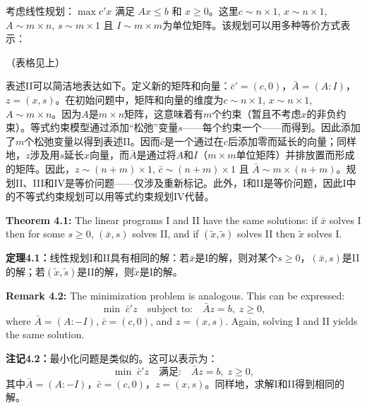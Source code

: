 \begin{translation}
考虑线性规划：$\max c' x$ 满足 $Ax \le b$ 和 $x \ge 0$。这里$c \sim n \times 1$, $x \sim n \times 1$, $A \sim m \times n$, $s \sim m \times 1$ 且 $I \sim m \times m$为单位矩阵。该规划可以用多种等价方式表示：

（表格见上）

表述II可以简洁地表达如下。定义新的矩阵和向量：$\bar{c}' = (c,0)$，$\bar{A} = (A : I)$，$z = (x, s)$。在初始问题中，矩阵和向量的维度为$c \sim n \times 1$, $x \sim n \times 1$, $A \sim m \times n$。因为$A$是$m \times n$矩阵，这意味着有$m$个约束（暂且不考虑$x$的非负约束）。等式约束模型通过添加``松弛''变量$s$——每个约束一个——而得到。因此添加了$m$个松弛变量以得到表述II。因而$\bar{c}$是一个通过在$c$后添加零而延长的向量；同样地，$z$涉及用$s$延长$x$向量，而$\bar{A}$是通过将$A$和$I$（$m \times m$单位矩阵）并排放置而形成的矩阵。因此，$z \sim (n+m) \times 1$, $\bar{c} \sim (n+m) \times 1$ 且 $\bar{A} \sim m \times (n + m)$。规划II、III和IV是等价问题——仅涉及重新标记。此外，I和II是等价问题，因此I中的不等式约束规划可以用等式约束规划IV代替。
\end{translation}

\begin{original}
\textbf{Theorem 4.1:} The linear programs I and II have the same solutions: if $\bar{x}$ solves I then for some $s \ge 0$, $(\bar{x}, s)$ solves II, and if $(\tilde{x}, \tilde{s})$ solves II then $\tilde{x}$ solves I.
\end{original}
\begin{translation}
\textbf{定理4.1：}线性规划I和II具有相同的解：若$\bar{x}$是I的解，则对某个$s \ge 0$，$(\bar{x}, s)$是II的解；若$(\tilde{x}, \tilde{s})$是II的解，则$\tilde{x}$是I的解。
\end{translation}

\begin{original}
\textbf{Remark 4.2:} The minimization problem is analogous. This can be expressed:
\[
\min \; \bar{c}' z \quad \text{subject to:} \quad \bar{A}z = b,\; z \ge 0,
\]
where $\bar{A} = (A : -I)$, $\bar{c} = (c,0)$, and $z = (x, s)$. Again, solving I and II yields the same solution.
\end{original}
\begin{translation}
\textbf{注记4.2：}最小化问题是类似的。这可以表示为：
\[
\min \; \bar{c}' z \quad \text{满足:} \quad \bar{A}z = b,\; z \ge 0,
\]
其中$\bar{A} = (A : -I)$，$\bar{c} = (c,0)$，$z = (x, s)$。同样地，求解I和II得到相同的解。
\end{translation}

